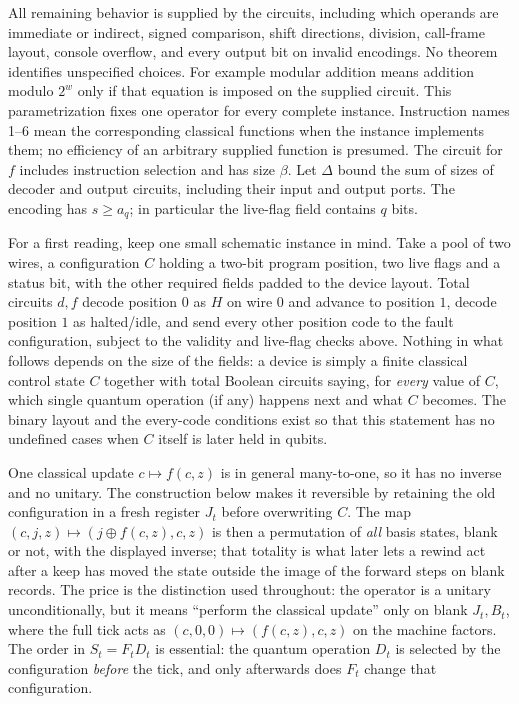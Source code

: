 \begin{definition}
All remaining behavior is supplied by the circuits, including which
operands are immediate or indirect, signed comparison, shift directions,
division, call-frame layout, console overflow, and every output bit on
invalid encodings. No theorem identifies unspecified choices.
For example modular addition means addition modulo $2^w$ only if that
equation is imposed on the supplied circuit. This parametrization fixes
one operator for every complete instance. Instruction names 1--6 mean
the corresponding classical functions when the instance implements them;
no efficiency of an arbitrary supplied function is presumed.
The circuit for $f$ includes instruction selection and has size $\beta$.
Let $\Delta$ bound the sum of sizes of decoder and output circuits,
including their input and output ports. The encoding has
$s\geq a_q$; in particular the live-flag field contains $q$ bits.
\end{definition}

For a first reading, keep one small schematic instance in mind. Take a
pool of two wires, a configuration $C$ holding a two-bit program position,
two live flags and a status bit, with the other required fields padded to
the device layout. Total circuits $d,f$ decode position $0$ as $H$ on
wire $0$ and advance to position $1$, decode position $1$ as halted/idle,
and send every other position code to the fault configuration, subject to
the validity and live-flag checks above. Nothing in what follows depends on
the size of the fields: a device is simply a finite classical control
state $C$ together with total Boolean circuits saying, for \emph{every}
value of $C$, which single quantum operation (if any) happens next and
what $C$ becomes. The binary layout and the every-code conditions exist
so that this statement has no undefined cases when $C$ itself is later
held in qubits.

One classical update $c\mapsto f(c,z)$ is in general many-to-one, so it
has no inverse and no unitary. The construction below makes it reversible
by retaining the old configuration in a fresh register $J_t$ before
overwriting $C$. The map
$(c,j,z)\mapsto(j\oplus f(c,z),c,z)$ is then a permutation of \emph{all}
basis states, blank or not, with the displayed inverse; that totality is
what later lets a rewind act after a keep has moved the state outside the
image of the forward steps on blank records. The price is the distinction
used throughout: the operator is a unitary unconditionally, but it means
``perform the classical update'' only on blank $J_t,B_t$, where the full
tick acts as $(c,0,0)\mapsto(f(c,z),c,z)$ on the machine factors.
The order in $S_t=F_tD_t$ is essential: the quantum operation $D_t$ is
selected by the configuration \emph{before} the tick, and only afterwards
does $F_t$ change that configuration.

